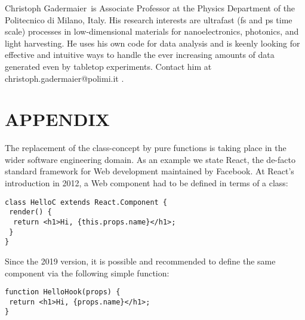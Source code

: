 \documentclass{IEEEcsmag}
\begin{document}
\begin{IEEEbiography}{Christoph Gadermaier}{\,} is Associate Professor at the Physics Department of the Politecnico di Milano, Italy. His research interests are ultrafast (fs and ps time scale) processes in low-dimensional materials for nanoelectronics, photonics, and light harvesting. He uses his own code for data analysis and is keenly looking for effective and intuitive ways to handle the ever increasing amounts of data generated even by tabletop experiments. Contact him at christoph.gadermaier@polimi.it .\vspace*{8pt}
\end{IEEEbiography}

\section{APPENDIX}
The replacement of the class-concept by pure functions is taking place in the wider software engineering domain. As an example we state React, the de-facto standard framework for Web development maintained by Facebook.
At React’s introduction in 2012, a Web component had to be defined in terms of a class:
{\color{magenta}\begin{verbatim}
class HelloC extends React.Component {
 render() {
  return <h1>Hi, {this.props.name}</h1>;
 }
}
\end{verbatim}}
Since the 2019 version, it is possible and recommended to define the same component via the following simple function:
{\color{magenta}\begin{verbatim}
function HelloHook(props) {
 return <h1>Hi, {props.name}</h1>;
}
\end{verbatim}}
\end{document}
